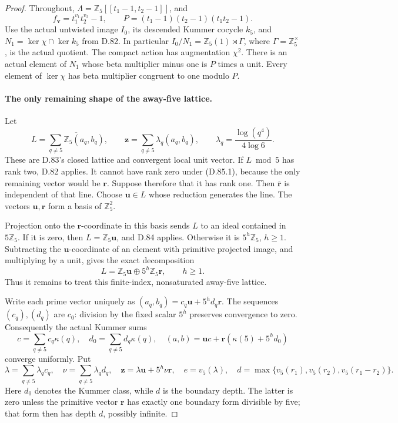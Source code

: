 \begin{proof}
Throughout, \(\Lambda=\mathbb Z_5[[t_1-1,t_2-1]]\), and
\[
 f_{\mathbf v}=t_1^{v_1}t_2^{v_2}-1,
 \qquad P=(t_1-1)(t_2-1)(t_1t_2-1).
\]
Use the actual untwisted image \(I_0\), its descended Kummer
cocycle \(k_5\), and \(N_1=\ker\chi\cap\ker k_5\) from
D.82. In particular \(I_0/N_1=\mathbb Z_5(1)\rtimes\Gamma\),
where \(\Gamma=\mathbb Z_5^\times\), is the actual quotient.
The compact action has augmentation \(\chi^2\).
There is an actual element of \(N_1\) whose beta multiplier
minus one is \(P\) times a unit. Every element of \(\ker\chi\)
has beta multiplier congruent to one modulo \(P\).

\paragraph{The only remaining shape of the away-five lattice.}
Let
\[
 L=\overline{\sum_{q\ne5}\mathbb Z_5(a_q,b_q)},
 \qquad
 \mathbf z=\sum_{q\ne5}\lambda_q(a_q,b_q),
 \qquad \lambda_q=\frac{\log(q^4)}{4\log6}.
                                                               \tag{D.85.6}
\]
These are D.83's closed lattice and convergent local unit
vector. If \(L\bmod5\) has rank two, D.82 applies. It
cannot have rank zero under (D.85.1), because the only
remaining vector would be \(\mathbf r\). Suppose therefore
that it has rank one. Then \(\overline{\mathbf r}\) is
independent of that line. Choose \(\mathbf u\in L\) whose
reduction generates the line. The vectors
\(\mathbf u,\mathbf r\) form a basis of \(\mathbb Z_5^2\).

Projection onto the \(\mathbf r\)-coordinate in this basis
sends \(L\) to an ideal contained in \(5\mathbb Z_5\).
If it is zero, then \(L=\mathbb Z_5\mathbf u\), and D.84
applies. Otherwise it is \(5^h\mathbb Z_5\), \(h\ge1\).
Subtracting the \(\mathbf u\)-coordinate of an element
with primitive projected image, and multiplying by a unit,
gives the exact decomposition
\[
 L=\mathbb Z_5\mathbf u\oplus5^h\mathbb Z_5\mathbf r,
 \qquad h\ge1.
                                                               \tag{D.85.7}
\]
Thus it remains to treat this finite-index, nonsaturated
away-five lattice.

Write each prime vector uniquely as
\((a_q,b_q)=c_q\mathbf u+5^h d_q\mathbf r\).
The sequences \((c_q),(d_q)\) are \(c_0\): division by
the fixed scalar \(5^h\) preserves convergence to zero.
Consequently the actual Kummer sums
\[
 c=\sum_{q\ne5}c_q\kappa(q),\quad
 d_0=\sum_{q\ne5}d_q\kappa(q),\quad
 (a,b)=\mathbf u c+\mathbf r(\kappa(5)+5^h d_0)
                                                               \tag{D.85.8}
\]
converge uniformly. Put
\[
 \lambda=\sum_{q\ne5}\lambda_qc_q,
 \quad \nu=\sum_{q\ne5}\lambda_qd_q,
 \quad \mathbf z=\lambda\mathbf u+5^h\nu\mathbf r,
 \quad e=v_5(\lambda),
 \quad d=\max\{v_5(r_1),v_5(r_2),v_5(r_1-r_2)\}.
                                                               \tag{D.85.9}
\]
Here \(d_0\) denotes the Kummer class, while \(d\) is
the boundary depth. The latter is zero unless the primitive
vector \(\mathbf r\) has exactly one boundary form divisible
by five; that form then has depth \(d\), possibly infinite.


\end{proof}
